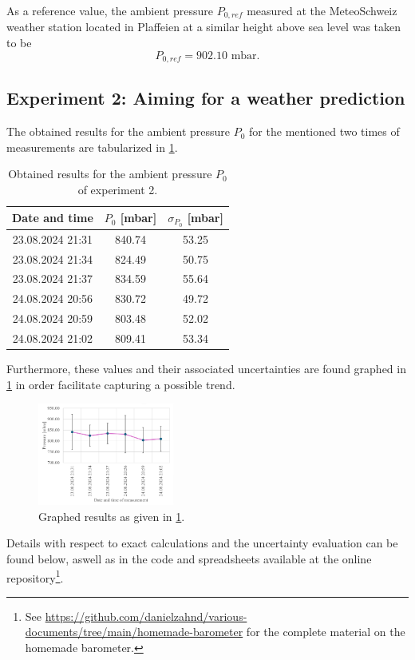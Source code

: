 \documentclass[a4paper,11pt, twocolumn]{article}
\begin{document}
As a reference value, the ambient pressure $P_{0,ref}$ measured at the MeteoSchweiz weather station located in Plaffeien at a similar height above sea level was taken to be \begin{equation}
	P_{0,ref} = 902.10 \text{ mbar}.
\end{equation}

\subsection{Experiment 2: Aiming for a weather prediction}
The obtained results for the ambient pressure $P_0$ for the mentioned two times of measurements are tabularized in \cref{tab:experiment_2_results}.
\begin{table}[h]
	\small
	\centering
	\begin{tabular}{|c|c|c|}
		\hline
		 \textbf{Date and time} & \textbf{$P_0$ [mbar]} & \textbf{$\sigma_{P_0}$ [mbar]} \\
		\hline\hline
		23.08.2024 21:31 &	840.74 &	53.25 \\
		\hline
		23.08.2024 21:34 &	824.49 &	50.75 \\
		\hline
		23.08.2024 21:37 &	834.59 &	55.64 \\
		\hline
		24.08.2024 20:56 &	830.72 &	49.72 \\
		\hline
		24.08.2024 20:59 &	803.48 &	52.02 \\
		\hline
		24.08.2024 21:02 &	809.41 &	53.34 \\
		\hline
	\end{tabular}
	\label{tab:experiment_2_results}
	\caption{Obtained results for the ambient pressure $P_0$ of experiment 2.}
\end{table} Furthermore, these values and their associated uncertainties are found graphed in \cref{fig:experiment_2_results} in order facilitate capturing a possible trend.
\begin{figure}[h]
	\centering
	\includegraphics[width=0.4\textwidth]{figures/experiment_2_results_br.pdf}
	\caption{Graphed results as given in \cref{tab:experiment_2_results}.}
	\label{fig:experiment_2_results}
\end{figure} Details with respect to exact calculations and the uncertainty evaluation can be found below, aswell as in the code and spreadsheets available at the online repository\footnote{See \url{https://github.com/danielzahnd/various-documents/tree/main/homemade-barometer} for the complete material on the homemade barometer.}.
\end{document}
